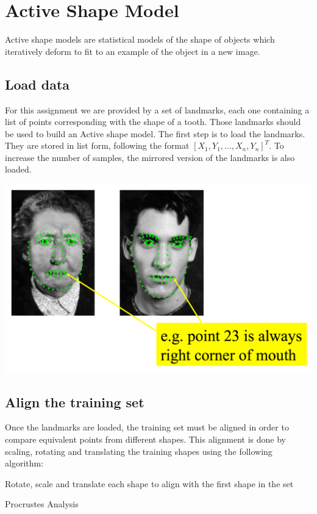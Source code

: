 \section{Active Shape Model}

Active shape models are statistical models of the shape
of objects which iteratively deform to fit to an example
of the object in a new image.

\subsection{Load data}
For this assignment we are provided by a set of landmarks, each one
containing a list of points corresponding with the shape of a tooth.
Those landmarks should be used to build an Active shape model.
The first step is to load the landmarks. They are stored in list form,
following the format ${[X_1, Y_1, \ldots, X_n, Y_n]}^T$. To increase
the number of samples, the mirrored version of the landmarks is also
loaded.

\includegraphics[width=0.7\linewidth]{img/landmarks}


\subsection{Align the training set}
Once the landmarks are loaded, the training set must be aligned in
order to compare equivalent points from different shapes. This
alignment is done by scaling, rotating and translating the training
shapes using the following algorithm:

\begin{algorithm}
\SetAlgoLined 
Rotate, scale and translate each shape to align with the
first shape in the set\;
\caption{Procrustes Analysis}
\end{algorithm}

